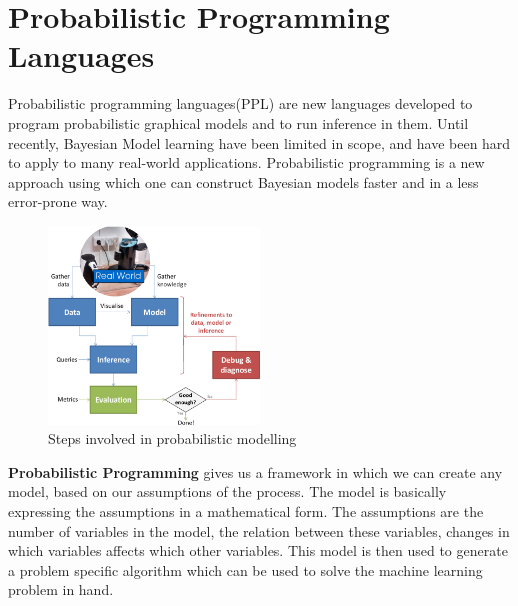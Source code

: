 \section{Probabilistic Programming Languages}

Probabilistic programming languages(PPL) are new languages developed to program probabilistic graphical models and to run inference in them. 
Until recently, Bayesian Model learning have been limited in scope, and have been hard to apply to many real-world applications. Probabilistic programming is a new approach using which one can construct Bayesian models faster and in a less error-prone way. 


\begin{figure}[htp]
\centering
\includegraphics[width=0.5\textwidth]{pictures/Lifecycle.png}
\caption[Steps involved in probabilistic modelling ]{Steps involved in probabilistic modelling  \protect\footnotemark }
\label{}
\end{figure}

\textbf{Probabilistic Programming} gives us a framework in which we can create any model, based on our assumptions of the process. The model is basically expressing the assumptions in a mathematical form. The assumptions are the number of variables in the model, the relation between these variables, changes in which variables affects which other variables. This model is then used to generate a problem specific algorithm which can be used to solve the machine learning problem in hand. 

